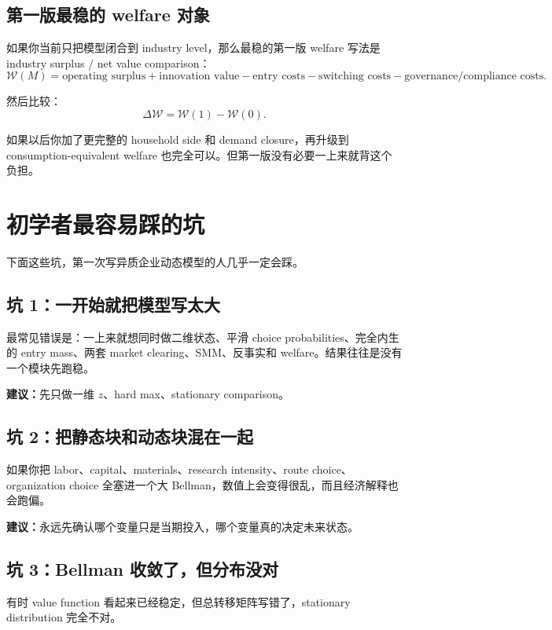 \documentclass[12pt]{ctexart}
\begin{document}
\subsection{第一版最稳的 welfare 对象}

如果你当前只把模型闭合到 industry level，那么最稳的第一版 welfare 写法是 industry surplus / net value comparison：
\[
\mathcal W(M)
=
\text{operating surplus}
+
\text{innovation value}
-
\text{entry costs}
-
\text{switching costs}
-
\text{governance/compliance costs}.
\]

然后比较：
\[
\Delta \mathcal W
=
\mathcal W(1)-\mathcal W(0).
\]

如果以后你加了更完整的 household side 和 demand closure，再升级到 consumption-equivalent welfare 也完全可以。但第一版没有必要一上来就背这个负担。

\section{初学者最容易踩的坑}

下面这些坑，第一次写异质企业动态模型的人几乎一定会踩。

\subsection{坑 1：一开始就把模型写太大}

最常见错误是：一上来就想同时做二维状态、平滑 choice probabilities、完全内生的 entry mass、两套 market clearing、SMM、反事实和 welfare。结果往往是没有一个模块先跑稳。

\textbf{建议：}先只做一维 $z$、hard max、stationary comparison。

\subsection{坑 2：把静态块和动态块混在一起}

如果你把 labor、capital、materials、research intensity、route choice、organization choice 全塞进一个大 Bellman，数值上会变得很乱，而且经济解释也会跑偏。

\textbf{建议：}永远先确认哪个变量只是当期投入，哪个变量真的决定未来状态。

\subsection{坑 3：Bellman 收敛了，但分布没对}

有时 value function 看起来已经稳定，但总转移矩阵写错了，stationary distribution 完全不对。
\end{document}
